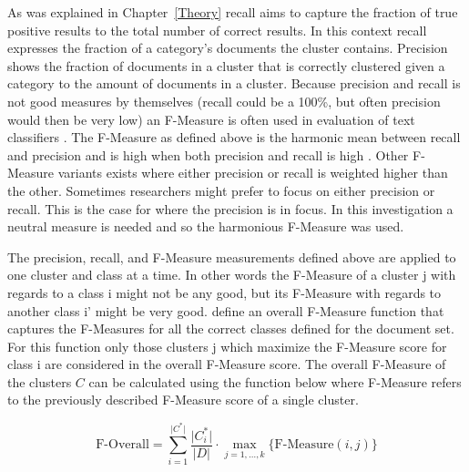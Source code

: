 As was explained in Chapter~\ref{Theory} recall aims to capture the fraction of true positive results to the total number of correct results. In this context recall expresses the fraction of a category's documents the cluster contains. Precision shows the fraction of documents in a cluster that is correctly clustered given a category to the amount of documents in a cluster. Because precision and recall is not good measures by themselves (recall could be a 100\%, but often precision would then be very low) an F-Measure is often used in evaluation of text classifiers \cite{Baeza-Yates2011a}. The F-Measure as defined above is the harmonic mean between recall and precision and is high when both precision and recall is high \cite{Baeza-Yates2011b}. Other F-Measure variants exists where either precision or recall is weighted higher than the other. Sometimes researchers might prefer to focus on either precision or recall. This is the case for \cite{Moe2014compact} where the precision is in focus. In this investigation a neutral measure is needed and so the harmonious F-Measure was used. 

The precision, recall, and F-Measure measurements defined above are applied to one cluster and class at a time. In other words the F-Measure of a cluster j with regards to a class i might not be any good, but its F-Measure with regards to another class i' might be very good. \cite{Chim2007} define an overall F-Measure function that captures the F-Measures for all the correct classes defined for the document set. For this function only those clusters j which maximize the F-Measure score for class i are considered in the overall F-Measure score. The overall F-Measure of the clusters \(C\) can be calculated using the function below where F-Measure refers to the previously described F-Measure score of a single cluster.

\begin{displaymath}
\text{F-Overall} = \sum_{i=1}^{\vert C^* \vert} \frac{\vert C_i^* \vert}{\vert D \vert} \cdot \max_{j=1,\dots,k} \{\text{F-Measure}(i,j)\}
\end{displaymath}

